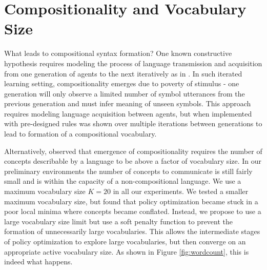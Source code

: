 \documentclass[letterpaper]{article} %
\begin{document}
\section{Compositionality and Vocabulary Size}
What leads to compositional syntax formation? One known constructive hypothesis requires modeling the process of language transmission and acquisition from one generation of agents to the next iteratively as in \cite{kirby14iterated}. In such iterated learning setting, compositionality emerges due to poverty of stimulus - one generation will only observe a limited number of symbol utterances from the previous generation and must infer meaning of unseen symbols. This approach requires modeling language acquisition between agents, but when implemented with pre-designed rules was shown over multiple iterations between generations to lead to formation of a compositional vocabulary.

Alternatively, \cite{nowak00syntax} observed that emergence of compositionality requires the number of concepts describable by a language to be above a factor of vocabulary size. In our preliminary environments the number of concepts to communicate is still fairly small and is within the capacity of a non-compositional language. We use a maximum vocabulary size $K=20$ in all our experiments. We tested a smaller maximum vocabulary size, but found that policy optimization became stuck in a poor local minima where concepts became conflated. Instead, we propose to use a large vocabulary size limit but use a soft penalty function to prevent the formation of unnecessarily large vocabularies. This allows the intermediate stages of policy optimization to explore large vocabularies, but then converge on an appropriate active vocabulary size. As shown in Figure \ref{fig:wordcount}, this is indeed what happens.
\end{document}
